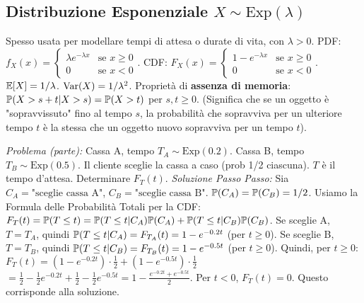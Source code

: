 \documentclass[12pt,a4paper]{article}
\begin{document}
\begin{example}
\subsection{Distribuzione Esponenziale \texorpdfstring{$X \sim \text{Exp}(\lambda)$}{X ~ Exp(lambda)}}
Spesso usata per modellare tempi di attesa o durate di vita, con $\lambda > 0$.
PDF: $f_X(x) = \begin{cases} \lambda e^{-\lambda x} & \text{se } x \ge 0 \\ 0 & \text{se } x < 0 \end{cases}$.
CDF: $F_X(x) = \begin{cases} 1 - e^{-\lambda x} & \text{se } x \ge 0 \\ 0 & \text{se } x < 0 \end{cases}$.
$\mathbb{E}[X] = 1/\lambda$.
$\mathrm{Var}(X) = 1/\lambda^2$.
Proprietà di \textbf{assenza di memoria}: $\mathbb{P}(X > s+t | X > s) = \mathbb{P}(X > t)$ per $s, t \ge 0$.
(Significa che se un oggetto è "sopravvissuto" fino al tempo $s$, la probabilità che sopravviva per un ulteriore tempo $t$ è la stessa che un oggetto nuovo sopravviva per un tempo $t$).

\begin{example}
\textit{Problema (parte):} Cassa A, tempo $T_A \sim \text{Exp}(0.2)$. Cassa B, tempo $T_B \sim \text{Exp}(0.5)$. Il cliente sceglie la cassa a caso (prob 1/2 ciascuna). $T$ è il tempo d'attesa.
Determinare $F_T(t)$.
\textit{Soluzione Passo Passo:}
Sia $C_A = \text{"sceglie cassa A"}$, $C_B = \text{"sceglie cassa B"}$. $\mathbb{P}(C_A)=\mathbb{P}(C_B)=1/2$.
Usiamo la Formula delle Probabilità Totali per la CDF:
$F_T(t) = \mathbb{P}(T \le t) = \mathbb{P}(T \le t | C_A)\mathbb{P}(C_A) + \mathbb{P}(T \le t | C_B)\mathbb{P}(C_B)$.
Se sceglie A, $T=T_A$, quindi $\mathbb{P}(T \le t | C_A) = F_{T_A}(t) = 1 - e^{-0.2t}$ (per $t \ge 0$).
Se sceglie B, $T=T_B$, quindi $\mathbb{P}(T \le t | C_B) = F_{T_B}(t) = 1 - e^{-0.5t}$ (per $t \ge 0$).
Quindi, per $t \ge 0$:
$F_T(t) = (1 - e^{-0.2t}) \cdot \frac{1}{2} + (1 - e^{-0.5t}) \cdot \frac{1}{2}$
$= \frac{1}{2} - \frac{1}{2}e^{-0.2t} + \frac{1}{2} - \frac{1}{2}e^{-0.5t} = 1 - \frac{e^{-0.2t} + e^{-0.5t}}{2}$.
Per $t < 0$, $F_T(t)=0$.
Questo corrisponde alla soluzione.
\end{example}


\end{example}
\end{document}

